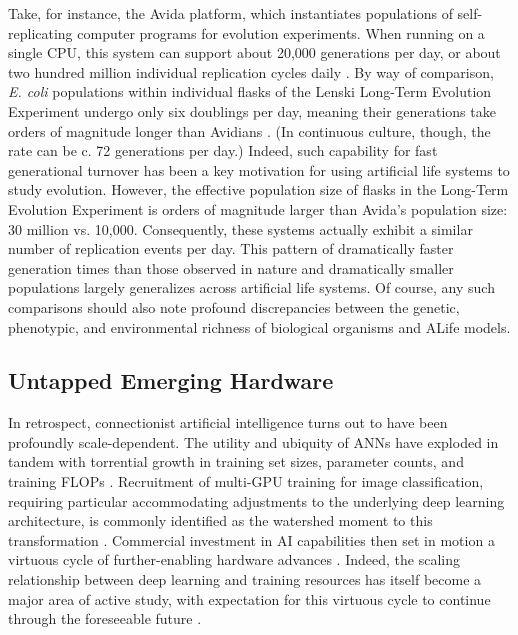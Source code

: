 Take, for instance, the Avida platform, which instantiates populations of self-replicating computer programs for evolution experiments.
When running on a single CPU, this system can support about 20,000 generations per day, or about two hundred million individual replication cycles daily \citep{ofria2009artificial}.
By way of comparison, \textit{E. coli} populations within individual flasks of the Lenski Long-Term Evolution Experiment undergo only six doublings per day, meaning their generations take orders of magnitude longer than Avidians \citep{good2017dynamics}.
(In continuous culture, though, the rate can be c. 72 generations per day.)
Indeed, such capability for fast generational turnover has been a key motivation for using artificial life systems to study evolution.
However, the effective population size of flasks in the Long-Term Evolution Experiment is orders of magnitude larger than Avida's population size: 30 million vs. 10,000.
Consequently, these systems actually exhibit a similar number of replication events per day.
This pattern of dramatically faster generation times than those observed in nature and dramatically smaller populations largely generalizes across artificial life systems.
Of course, any such comparisons should also note profound discrepancies between the genetic, phenotypic, and environmental richness of biological organisms and ALife models.


\subsection{Untapped Emerging Hardware}

In retrospect, connectionist artificial intelligence turns out to have been profoundly scale-dependent.
The utility and ubiquity of ANNs have exploded in tandem with torrential growth in training set sizes, parameter counts, and training FLOPs \citep{marcus2018deep}.
Recruitment of multi-GPU training for image classification, requiring particular accommodating adjustments to the underlying deep learning architecture, is commonly identified as the watershed moment to this transformation
 \citep{krizhevsky2012imagenet}.
Commercial investment in AI capabilities then set in motion a virtuous cycle of further-enabling hardware advances \citep{jouppi2017datacenter}.
Indeed, the scaling relationship between deep learning and training resources has itself become a major area of active study, with expectation for this virtuous cycle to continue through the foreseeable future \citep{kaplan2020scaling}.


